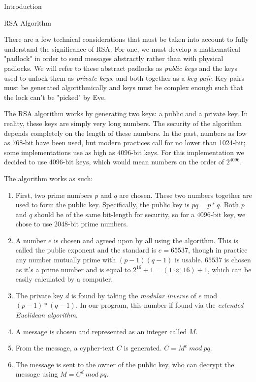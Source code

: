 \documentclass[landscape,fontscale=.4,paperwidth=48in,paperheight=36in]{baposter} %
\begin{document}
\begin{poster}
\begin{posterbox}[name=intro,column=0,below=objectives, span=13]{Introduction}
\end{posterbox}


\begin{posterbox}[name=rsa,column=13,row=0,span=17]{RSA Algorithm} %

There are a few technical considerations that must be taken into account to fully understand the significance of RSA. For one, we must develop a mathematical "padlock" in order to send messages abstractly rather than with physical padlocks. We will refer to these abstract padlocks as \emph{public keys} and the keys used to unlock them as \emph{private keys}, and both together as a \emph{key pair}. Key pairs must be generated algorithmically and keys must be complex enough such that the lock can't be "picked" by Eve.

The RSA algorithm works by generating two keys: a public and a private key. In reality, these keys are simply very long numbers. The security of the algorithm depends completely on the length of these numbers. In the past, numbers as low as 768-bit have been used, but modern practices call for no lower than 1024-bit; some implementations use as high as 4096-bit keys. For this implementation we decided to use 4096-bit keys, which would mean numbers on the order of $2^{4096}$.

The algorithm works as such:
\begin{enumerate}
	\item First, two prime numbers $p$ and $q$ are chosen. These two numbers together are used to form the public key. Specifically, the public key is ${pq = p * q}$. Both $p$ and $q$ should be of the same bit-length for security, so for a 4096-bit key, we chose to use 2048-bit prime numbers. 
	\item A number $e$ is chosen and agreed upon by all using the algorithm. This is called the public exponent and the standard is $e = 65537$, though in practice any number mutually prime with ${(p-1)(q-1)}$ is usable. $65537$ is chosen as it's a prime number and is equal to ${2^{16}+1 = (1 \ll 16) + 1}$, which can be easily calculated by a computer.
	\item The private key $d$ is found by taking the \emph{modular inverse} of $e$ mod ${(p-1)*(q-1)}$. In our program, this number if found via the \emph{extended Euclidean algorithm}.
	\item A message is chosen and represented as an integer called $M$.
	\item From the message, a cypher-text $C$ is generated. $C = M^e\ mod\ pq$.
	\item The message is sent to the owner of the public key, who can decrypt the message using $M = C^d\ mod\ pq$.
\end{enumerate}


\end{posterbox}
\end{poster}
\end{document}
